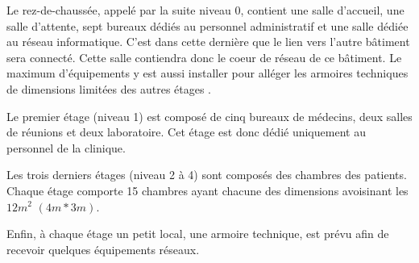 %

Le rez-de-chaussée, appelé par la suite niveau 0, contient une salle d'accueil, une salle d'attente, sept bureaux dédiés au personnel administratif et une salle dédiée au réseau informatique.
C'est dans cette dernière que le lien vers l'autre bâtiment sera connecté.
Cette salle contiendra donc le coeur de réseau de ce bâtiment.
Le maximum d'équipements y est aussi installer pour alléger les armoires techniques de dimensions limitées des autres étages .

%

Le premier étage (niveau 1) est composé de cinq bureaux de médecins, deux salles de réunions et deux laboratoire.
Cet étage est donc dédié uniquement au personnel de la clinique.

%

Les trois derniers étages (niveau 2 à 4) sont composés des chambres des patients.
Chaque étage comporte 15 chambres ayant chacune des dimensions avoisinant les $12 m^2$ $(4m*3m)$.

%

Enfin, à chaque étage un petit local, une armoire technique, est prévu afin de recevoir quelques équipements réseaux.


%
%











